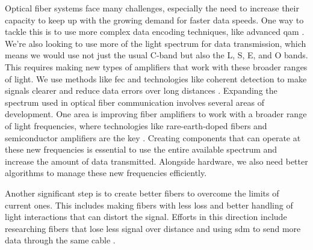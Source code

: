Optical fiber systems face many challenges, especially the need to increase their capacity to keep up with the growing demand for faster data speeds. One way to tackle this is to use more complex data encoding techniques, like advanced \gls{qam} \cite{huawei2023}. We're also looking to use more of the light spectrum for data transmission, which means we would use not just the usual C-band but also the L, S, E, and O bands. This requires making new types of amplifiers that work with these broader ranges of light. We use methods like \gls{fec} and technologies like coherent detection to make signals clearer and reduce data errors over long distances . 
Expanding the spectrum used in optical fiber communication involves several areas of development. One area is improving fiber amplifiers to work with a broader range of light frequencies, where technologies like rare-earth-doped fibers and semiconductor amplifiers are the key \cite{huawei2023}. Creating components that can operate at these new frequencies is essential to use the entire available spectrum and increase the amount of data transmitted. Alongside hardware, we also need better algorithms to manage these new frequencies efficiently. 

Another significant step is to create better fibers to overcome the limits of current ones. This includes making fibers with less loss and better handling of light interactions that can distort the signal. Efforts in this direction include researching fibers that lose less signal over distance and using \gls{sdm} to send more data through the same cable \cite{kaur2022recent}.






